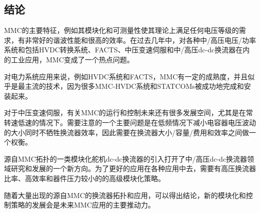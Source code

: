   \subsection{结论}
  
  MMC的主要特征，例如其模块化和可测量性使其理论上满足任何电压等级的需求，有非常好的谐波性能和很高的效率。在过去几年中，对各种中/高压电压/功率系统和包括HVDC转换系统、FACTS、中压变速伺服和中/高压dc-dc换流器在内的工业应用，MMC变成了一个热点问题。
  
  对电力系统应用来说，例如HVDC系统和FACTS，MMC有一定的成熟度，并且似乎是最主流的技术，因为很多MMC-HVDC系统和STATCOMs被成功地完成和安装起来。
  
  对于中压变速伺服，有关MMC的运行和控制未来还有很多发展空间，尤其是在常转速低速的情况下。需要注意的一个主要问题是在低频情况下减小电容器电压波动的大小同时不牺牲换流器效率，因此需要在换流器大小/容量/费用和效率之间做一个权衡。
  
  源自MMC拓扑的一类模块化舵机dc-dc换流器的引入打开了中/高压dc-dc换流器领域研究和发展的一个新方向。为了更好的应用在各种应用中去，需要有高压换流器比率、高效率和器件压力较小的的高级模块化策略。
  
  随着大量出现的源自MMC的换流器拓扑和应用，可以得出结论，新的模块化和控制策略的发展会是未来MMC应用的主要推动力。
  
  
  